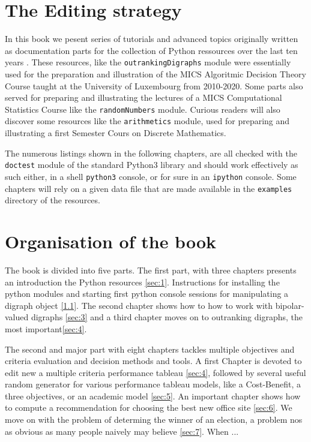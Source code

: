 \label{sec:0}



\section{The Editing strategy}

In this book we pesent series of tutorials and advanced topics originally written as documentation parts for the \Digraph collection of Python ressources over the last ten years \citep{BIS-2021}. These \Digraph resources, like the \texttt{outrankingDigraphs} module were essentially used for the preparation and illustration of the MICS Algoritmic Decision Theory Course taught at the University of Luxembourg from 2010-2020. Some parts also served for preparing and illustrating the lectures of a MICS Computational Statistics Course like the \texttt{randomNumbers} module. Curious readers will also discover some resources like the \texttt{arithmetics} module, used for preparing and illustrating a first Semester Cours on Discrete Mathematics.

The numerous listings shown in the following chapters, are all checked with the \texttt{doctest} module of the standard Python3 library and should work effectively as such either, in a shell \texttt{python3} console, or for sure in an \texttt{ipython} console. Some chapters will rely on a given data file that are made available in the \texttt{examples} directory of the \Digraph resources. 



\section{Organisation of the book}
The book is divided into five parts. The first part, with three chapters presents an introduction the \Digraph Python resources \ref{sec:1}. Instructions for installing the python modules and starting first python console sessions for manipulating a digraph object \ref{1.1}. The second chapter shows how to how to work with bipolar-valued digraphs \ref{sec:3} and a third chapter moves on to outranking digraphs, the most important\ref{sec:4}.

The second and major part with eight chapters tackles multiple objectives and criteria evaluation and decision methods and tools. A first Chapter is devoted to edit new a multiple criteria performance tableau \ref{sec:4}, followed by several useful random generator for various performance tableau models, like a Cost-Benefit, a three objectives, or an academic model \ref{sec:5}. An important chapter shows how to compute a recommendation for choosing the best new office site \ref{sec:6}. We move on with the problem of determing the winner of an election, a problem nos as obvious as many people naively may believe \ref{sec:7}. When ...

